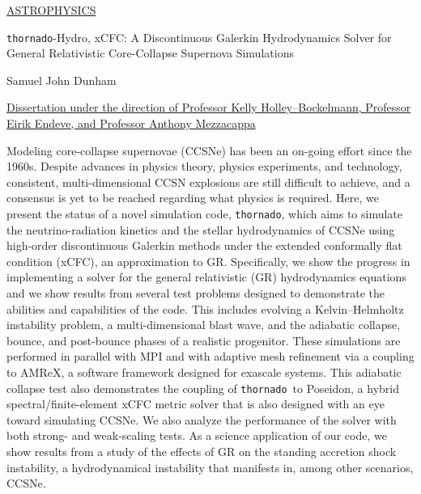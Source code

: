 \documentclass[10pt]{article}
\newcommand{\thornado}{\texttt{thornado}}
\begin{document}

\begin{flushright}
\underline{ASTROPHYSICS}
\end{flushright}\vspace{1em}

\flushleft

\begin{center}
\thornado-Hydro, xCFC: A Discontinuous Galerkin Hydrodynamics
Solver for General Relativistic
Core-Collapse Supernova Simulations
\end{center}\vspace{1em}

\begin{center}
Samuel John Dunham
\end{center}\vspace{1em}

\begin{center}
\ul{Dissertation under the direction of
Professor Kelly Holley--Bockelmann, Professor Eirik Endeve,
and Professor Anthony Mezzacappa}
\end{center}
\vspace{1em}

\begin{doublespace}

Modeling core-collapse supernovae (CCSNe) has been an on-going effort
since the 1960s.
Despite advances in physics theory, physics experiments, and technology,
consistent, multi-dimensional CCSN explosions are still difficult to achieve,
and a consensus is yet to be reached regarding what physics is required.
Here, we present the status of a novel simulation code, \thornado,
which aims to simulate the neutrino-radiation kinetics
and the stellar hydrodynamics of
CCSNe using high-order discontinuous Galerkin methods
under the extended conformally flat condition (xCFC), an approximation to GR.
Specifically, we show the progress in implementing a
solver for the general relativistic (GR)
hydrodynamics equations and we show results from several test problems
designed to demonstrate the abilities and capabilities of the code.
This includes evolving a Kelvin--Helmholtz instability problem,
a multi-dimensional blast wave, and
the adiabatic collapse, bounce, and post-bounce phases
of a realistic progenitor.
These simulations are performed
in parallel with MPI and with adaptive mesh refinement via a coupling
to AMReX, a software framework designed for exascale systems.
This adiabatic collapse test also demonstrates the coupling of \thornado\ to
Poseidon, a hybrid spectral/finite-element xCFC metric solver
that is also designed
with an eye toward simulating CCSNe.
We also analyze the performance of the solver with both
strong- and weak-scaling tests.
As a science application of our code,
we show results from a study of the effects of GR on the
standing accretion shock instability, a hydrodynamical instability
that manifests in, among other scenarios, CCSNe.

\end{doublespace}
\vspace{2em}
\end{document}
